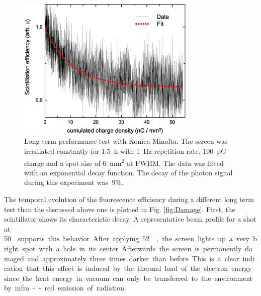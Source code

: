 \documentclass[%
preprint,
amsmath,
amssymb,
aip,
rsi, 
numerical,
floatfix,
]{revtex4-1}
\begin{document}
\begin{figure}
\includegraphics[width=8.5cm]{./Figures/Dt_Min_rel}%
\caption{\label{fig:Dt_Min_rel} Long term performance test with Konica Minolta: 
The screen was irradiated constantly for \SI{1.5}{\hour} with \SI{1}{\hertz} repetition rate, \SI{100}{\pico\coulomb} charge and a spot size of \SI{6}{\square\milli\meter} at FWHM. 
The data was fitted with an exponential decay function. 
The decay of the photon signal during this experiment was $~9\%$.}
\end{figure}

The temporal evolution of the fluorescence efficiency during a different long term test than the discussed above one is plotted in Fig. \ref{fig:Damage}.
First, the scintillator shows its characteristic decay. 
A representative beam profile for a shot at \SI[per-mode=symbol]{50}{\nano\coulomb \per \milli\meter\square}  supports this behavior.
After applying \SI[per-mode=symbol]{52}{\nano\coulomb \per \milli\meter\square}, the screen lights up a very bright spot with a hole in its center.
Afterwards the screen is permanently damaged and approximately three times darker than before.
This is a clear indication that this effect is induced by the thermal load of the electron energy since the heat energy in vacuum can only be transferred to the environment by infra--red emission of radiation.
\end{document}
